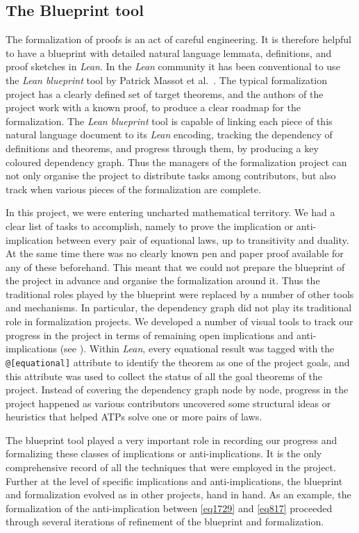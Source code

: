 \subsection{The Blueprint tool}

The formalization of proofs is an act of careful engineering. It is therefore helpful to  have a blueprint with detailed natural language lemmata, definitions, and proof sketches in \emph{Lean}. In the \emph{Lean} community it has been conventional to use the  \emph{Lean blueprint} tool by Patrick Massot et al.~\cite{GitHubGitHubPatrickMassotleanblueprint}. The typical formalization project has a clearly defined set of target theorems, and the authors of the project work with a known proof, to produce a clear roadmap for the formalization. The \emph{Lean blueprint} tool is capable of linking each piece of this natural language document to its \emph{Lean} encoding, tracking the dependency of definitions and theorems, and progress through them, by producing a key coloured dependency graph. Thus the managers of the formalization project can not only organise the project to distribute tasks among contributors, but also track when various pieces of the formalization are complete.

In this project, we were entering uncharted mathematical territory. We had a clear list of tasks to accomplish, namely to prove the implication or anti-implication between every pair of equational laws, up to transitivity and duality. At the same time there was no clearly known pen and paper proof available for any of these beforehand. This meant that we could not prepare the blueprint of the project in advance and organise the formalization around it. Thus the traditional roles played by the blueprint were replaced by a number of other tools and mechanisms. In particular, the dependency graph did not play its traditional role in formalization projects. We developed a number of visual tools to track our progress in the project  in terms of remaining open implications and anti-implications (see ). Within \emph{Lean}, every equational result was tagged with the \texttt{@[equational]} attribute to identify the theorem as one of the project goals, and this attribute was used to collect the status of all the goal theorems of the project. Instead of covering the dependency graph node by node, progress in the project happened as various contributors uncovered some structural ideas or heuristics that helped ATPs solve one or more pairs of laws.

The blueprint tool played a very important role in recording our progress and formalizing these classes of implications or anti-implications. It is the only comprehensive record of all the techniques that were employed in the project. Further at the level of specific implications and anti-implications, the blueprint and formalization evolved as in other projects, hand in hand. As an example, the formalization of the anti-implication between \eqref{eq1729} and \eqref{eq817} proceeded through several iterations of refinement of the blueprint and formalization.

